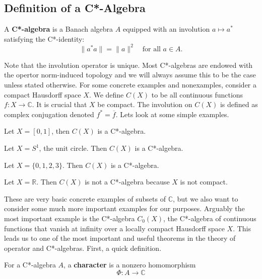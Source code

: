 \subsection{Definition of a C*-Algebra}
\begin{definition}
A \textbf{C*-algebra} is a Banach algebra \( A \) equipped with an involution \( a \mapsto a^* \) satisfying the C*-identity:
\[
\|a^*a\| = \|a\|^2 \quad \text{for all } a \in A.
\]
\end{definition}
Note that the involution operator is unique. Most C*-algebras are endowed with the
opertor norm-induced topology and we will always assume this to be the case unless
stated otherwise. For some concrete examples and nonexamples,
consider a compact Hausdorff space $X$. We define $C(X)$ to be all continuous functions
$f: X \to \mathbb{C}$. It is crucial that $X$ be compact. The involution on $C(X)$
is defined as complex conjugation denoted $f^* = \overline{f}$. Lets look at some
simple examples.
\begin{example}
    Let $X = [0,1]$, then $C(X)$ is a C*-algebra.
\end{example}

\begin{example}
    Let $X = S^1$, the unit circle. Then $C(X)$ is a C*-algebra.
\end{example}

\begin{example}
    Let $X = \{ 0, 1, 2, 3\}$. Then $C(X)$ is a C*-algebra.
\end{example}

\begin{example}
    Let $X = \mathbb{R}$. Then $C(X)$ is not a C*-algebra because $X$ is not compact.
\end{example}

These are very basic concrete examples of subsets of $\mathbb{C}$, but we also want
to consider some much more important examples for our purposes. Arguably the most important
example is the C*-algebra $C_0(X)$, the C*-algebra of continuous functions that vanish
at infinity over a locally compact Hausdorff space $X$. This leads us to one of the most
important and useful theorems in the theory of operator and C*-algebras. First, a quick
definition.
\begin{definition}
    For a C*-algebra $A$, a \textbf{character} is a nonzero homomorphism
    \begin{equation*}
        \Phi:A\to \mathbb{C}
    \end{equation*}
\end{definition}

